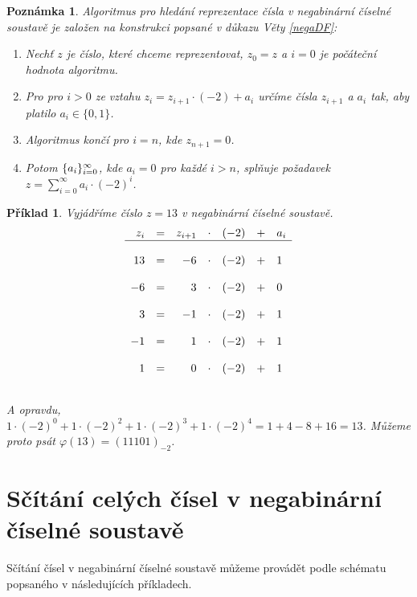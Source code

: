 \documentclass[12pt]{book}
\newtheorem*{pr}{Příklad}
\newtheorem{pozn}{Poznámka}
\begin{document}
\begin{pozn} Algoritmus pro hledání reprezentace čísla v negabinární číselné soustavě je založen na konstrukci popsané v důkazu Věty \ref{negaDF}:
\newline

	\begin{enumerate}
		\item Nechť $z$ je číslo, které chceme reprezentovat, $z_0 = z$ a $i=0$ je počáteční hodnota algoritmu.
		\item Pro pro $i>0$ ze vztahu $z_i=z_{i+1}\cdot(-2)+a_i$ určíme čísla $z_{i+1}$ a $a_i$ tak, aby platilo
              $a_i\in\{0,1\}$.
		\item Algoritmus končí pro $i = n$, kde $z_{n+1} = 0$.
		\item Potom $\{a_i\}_{i=0}^{\infty}$, kde $a_i=0$ pro každé $i>n$, splňuje požadavek $z=
		\sum_{i=0}^{\infty}a_i\cdot(-2)^i$.
	\end{enumerate}

	
\end{pozn}

\begin{pr} Vyjádříme číslo $z = 13$ v negabinární číselné soustavě.
$$
\begin{array}{rcrclcl}
z_i &=& z_{i+1}&\cdot&(-2) &+& a_i \\ \hline
&&&&&&\\
13 &=& -6&\cdot&(-2) &+& 1 \\
&&&&&&\\
-6 &=& 3&\cdot&(-2) &+& 0 \\
&&&&&&\\
3 &=& -1&\cdot&(-2) &+& 1 \\
&&&&&&\\
-1 &=& 1&\cdot&(-2) &+& 1 \\
&&&&&&\\
1 &=& 0&\cdot&(-2) &+& 1 \\
&&&&&&\\
\end{array}
$$

A opravdu, $1\cdot(-2)^0 + 1 \cdot(-2)^2+1\cdot(-2)^3+1\cdot(-2)^4 = 1 + 4 - 8 + 16 = 13$. Můžeme proto psát $\varphi(13) = (11101)_{-2}$.
\end{pr}

\section{Sčítání celých čísel v negabinární číselné soustavě}

 Sčítání čísel v negabinární číselné soustavě můžeme provádět podle schématu popsaného v následujících příkladech. 
 
\end{document}
